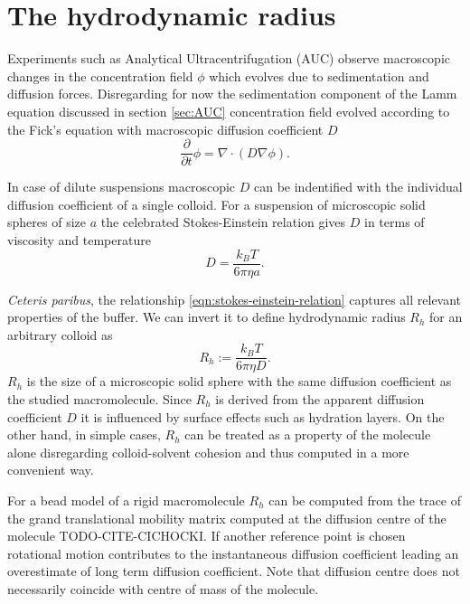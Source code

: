\documentclass{doctoral}
\newcommand{\pd}{\partial}
\begin{document}
\section{The hydrodynamic radius}

Experiments such as Analytical Ultracentrifugation (AUC) observe macroscopic changes in the concentration field $\phi$ which evolves due to sedimentation and diffusion forces. Disregarding for now the sedimentation component of the Lamm equation discussed in section \ref{sec:AUC} concentration field evolved according to the Fick's equation with macroscopic diffusion coefficient $D$
\begin{equation}
    \frac{\pd}{\pd t} \phi = \nabla \cdot ( D \nabla \phi ).
    \label{eqn:ficks-law}
\end{equation}

In case of dilute suspensions macroscopic $D$ can be indentified with the individual diffusion coefficient of a single colloid. For a suspension of microscopic solid spheres of size $a$ the celebrated Stokes-Einstein relation gives $D$ in terms of viscosity and temperature
\begin{equation}
    D = \frac{k_B T}{6 \pi \eta a}.
    \label{eqn:stokes-einstein-relation}
\end{equation}

\textit{Ceteris paribus}, the relationship \eqref{eqn:stokes-einstein-relation} captures all relevant properties of the buffer. We can invert it to define hydrodynamic radius $R_h$ for an arbitrary colloid as
\begin{equation}
    R_h :=  \frac{k_B T}{6 \pi \eta D}.
    \label{eqn:hydrodynamic-radius-definition}
\end{equation}
$R_h$ is the size of a microscopic solid sphere with the same diffusion coefficient as the studied macromolecule. Since $R_h$ is derived from the apparent diffusion coefficient $D$ it is influenced by surface effects such as hydration layers. On the other hand, in simple cases, $R_h$ can be treated as a property of the molecule alone disregarding colloid-solvent cohesion and thus computed in a more convenient way.

For a bead model of a rigid macromolecule $R_h$ can be computed from the trace of the grand translational mobility matrix computed at the diffusion centre of the molecule TODO-CITE-CICHOCKI. If another reference point is chosen rotational motion contributes to the instantaneous diffusion coefficient leading an overestimate of long term diffusion coefficient. Note that diffusion centre does not necessarily coincide with centre of mass of the molecule.
\end{document}
